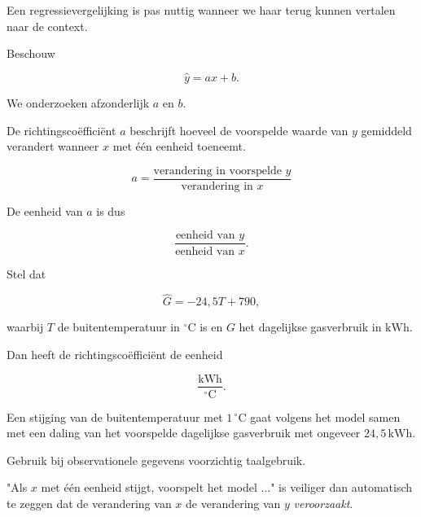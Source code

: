 \documentclass{ximera}
\begin{document}

Een regressievergelijking is pas nuttig wanneer we haar terug kunnen
vertalen naar de context.

Beschouw

\[
\hat y=ax+b.
\]

We onderzoeken afzonderlijk $a$ en $b$.



De richtingscoëfficiënt $a$ beschrijft hoeveel de voorspelde waarde
van $y$ gemiddeld verandert wanneer $x$ met één eenheid toeneemt.

\[
\boxed{
a=
\frac{\text{verandering in voorspelde }y}
{\text{verandering in }x}
}
\]

De eenheid van $a$ is dus

\[
\frac{\text{eenheid van }y}
{\text{eenheid van }x}.
\]

\begin{voorbeeld}
Stel dat

\[
\hat G=-24{,}5T+790,
\]

waarbij $T$ de buitentemperatuur in ${}^{\circ}\mathrm C$ is en $G$
het dagelijkse gasverbruik in $\mathrm{kWh}$.

Dan heeft de richtingscoëfficiënt de eenheid

\[
\frac{\mathrm{kWh}}{{}^{\circ}\mathrm C}.
\]

Een stijging van de buitentemperatuur met $1\,{}^{\circ}\mathrm C$
gaat volgens het model samen met een daling van het voorspelde
dagelijkse gasverbruik met ongeveer $24{,}5\,\mathrm{kWh}$.
\end{voorbeeld}

\begin{opmerking}
Gebruik bij observationele gegevens voorzichtig taalgebruik.

"Als $x$ met één eenheid stijgt, voorspelt het model ..." is veiliger
dan automatisch te zeggen dat de verandering van $x$ de verandering
van $y$ \emph{veroorzaakt}.
\end{opmerking}


\end{document}
